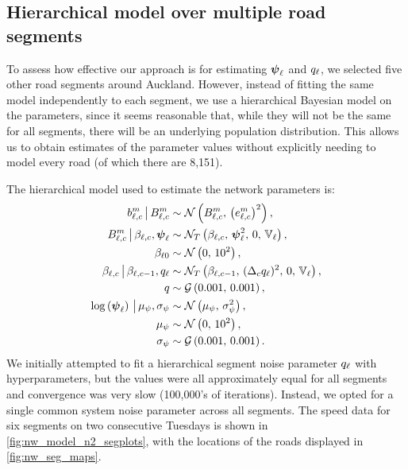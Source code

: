 \subsection{Hierarchical model over multiple road segments}
\label{sec:nw_par_est_multiple}



To assess how effective our approach is for estimating $\mathbf{\boldsymbol{\psi}}_\ell$ and $q_\ell$, we selected five other road segments around Auckland. However, instead of fitting the same model independently to each segment,  we use a hierarchical Bayesian model on the parameters, since it seems reasonable that, while they will not be the same for all segments, there will be an underlying population distribution. This allows us to obtain estimates of the parameter values without explicitly needing to model every road (of which there are 8,151).


The hierarchical model used to estimate the network parameters is:
\begin{equation}
\label{eq:tt_hist_hier}
\begin{split}
b_{\ell,c}^m \,\big|\, B_{\ell,c}^m &\sim \mathcal{N}\left(B_{\ell,c}^m,\, \left(e_{\ell,c}^m\right)^2\right), \\
B_{\ell,c}^m \,\big|\, \beta_{\ell,c}, \mathbf{\boldsymbol{\psi}}_{\ell} &\sim \mathcal{N}_T\left(\beta_{\ell,c},\, \mathbf{\boldsymbol{\psi}}_{\ell}^2,\, 0,\, \mathbb{V}_\ell\right), \\
\beta_{\ell0} &\sim \mathcal{N}\left(0,\, 10^2\right), \\
\beta_{\ell,c} \,\big|\, \beta_{\ell,c-1}, q_{\ell} &\sim \mathcal{N}_T\left(\beta_{\ell,c-1},\, (\Delta_c q_{\ell})^2,\, 0,\, \mathbb{V}_\ell\right), \\
q &\sim \mathcal{G}\left(0.001,\, 0.001\right), \\
\log\left(\mathbf{\boldsymbol{\psi}}_{\ell}\right) \,\big|\, \mu_\psi, \sigma_\psi &\sim \mathcal{N}\left(\mu_\psi,\, \sigma_\psi^2\right), \\
\mu_\psi &\sim \mathcal{N}\left(0,\, 10^2\right), \\
\sigma_\psi &\sim \mathcal{G}\left(0.001,\, 0.001\right).
\end{split}
\end{equation}
We initially attempted to fit a hierarchical segment noise parameter $q_{\ell}$ with hyper\-parameters, but the values were all approximately equal for all segments and convergence was very slow (100,000's of iterations). Instead, we opted for a single common system noise parameter across all segments. The speed data for six segments on two consecutive Tuesdays is shown in \cref{fig:nw_model_n2_segplots}, with the locations of the roads displayed in \cref{fig:nw_seg_maps}.


